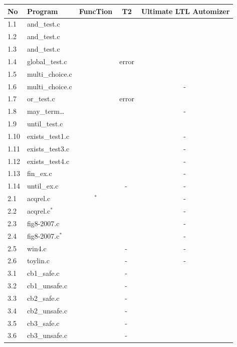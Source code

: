 \documentclass[11pt,a4paper,titlepage]{article}
\theoremstyle{definition}
\newcommand{\cmark}{\textcolor{green!75!black}{\ding{51}$^{\ }$}} %
\newcommand{\nmark}{-$^{\ }$} %
\newcommand{\smark}{\textcolor{green!75!black}{\ding{51}$^*$}} %
\newcommand{\xmark}{\textcolor{red}{\ding{55}$^{\ }$}} %
\begin{document}
\begin{table}
\scriptsize
\begin{center}
\begin{tabular}{llccc}
\textbf{No} & \textbf{Program} & \textbf{FuncTion} & \textbf{T2} & \textbf{Ultimate LTL Automizer} \\
\hline
1.1 & and\_test.c & \cmark & \xmark & \cmark \\
1.2 & and\_test.c & \cmark & \xmark & \cmark \\
1.3 & and\_test.c & \cmark & \cmark & \cmark \\
1.4 & global\_test.c & \cmark & error & \cmark \\
1.5 & multi\_choice.c & \cmark & \cmark & \cmark \\
1.6 & multi\_choice.c & \cmark & \cmark & \nmark \\
1.7 & or\_test.c & \cmark & error & \cmark \\
1.8 & may\_term\dots & \xmark & \cmark & \nmark \\
1.9 & until\_test.c & \cmark & \xmark & \cmark \\
1.10 & exists\_test1.c & \cmark & \cmark & \nmark \\
1.11 & exists\_test3.c & \cmark & \cmark & \nmark \\
1.12 & exists\_test4.c & \cmark & \cmark & \nmark \\
1.13 & fin\_ex.c & \cmark & \xmark & \nmark \\
1.14 & until\_ex.c & \cmark & \nmark & \nmark \\
\hline
2.1 & acqrel.c & \smark & \cmark & \nmark \\
2.2 & acqrel.c$^*$ & \cmark & \cmark & \nmark \\
2.3 & fig8-2007.c & \xmark & \cmark & \nmark \\
2.4 & fig8-2007.c$^*$ & \cmark & \cmark & \nmark \\
2.5 & win4.c & \cmark & \nmark & \nmark \\
2.6 & toylin.c & \xmark & \nmark & \nmark \\
\hline
3.1 & cb1\_safe.c & \cmark & \nmark & \cmark \\
3.2 & cb1\_unsafe.c & \cmark & \nmark & \cmark \\
3.3 & cb2\_safe.c & \cmark & \nmark & \cmark \\
3.4 & cb2\_unsafe.c & \cmark & \nmark & \cmark \\
3.5 & cb3\_safe.c & \cmark & \nmark & \cmark \\
3.6 & cb3\_unsafe.c & \cmark & \nmark & \cmark \\

\end{tabular}
\end{center}
\end{table}
\end{document}
